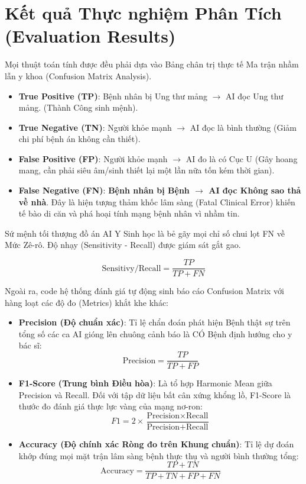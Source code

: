 \documentclass[conference,a4paper]{IEEEtran}
\begin{document}
\section{Kết quả Thực nghiệm Phân Tích (Evaluation Results)}
Mọi thuật toán tính được đều phải dựa vào Bảng chân trị thực tế Ma trận nhầm lẫn y khoa (Confusion Matrix Analysis).
\begin{itemize}
\item \textbf{True Positive (TP)}: Bệnh nhân bị Ung thư mảng $\rightarrow$ AI đọc Ung thư mảng. (Thành Công sinh mệnh).
\item \textbf{True Negative (TN)}: Người khỏe mạnh $\rightarrow$ AI đọc là bình thường (Giảm chi phí bệnh án không cần thiết).
\item \textbf{False Positive (FP)}: Người khỏe mạnh $\rightarrow$ AI đo là có Cục U (Gây hoang mang, cần phải siêu âm/sinh thiết lại một lần nữa tốn kém thời gian).
\item \textbf{False Negative (FN)}: \textbf{Bệnh nhân bị Bệnh $\rightarrow$ AI đọc Không sao thả về nhà}. Đây là hiện tượng thảm khốc lâm sàng (Fatal Clinical Error) khiến tế bào di căn và phá hoại tính mạng bệnh nhân vì nhầm tin.
\end{itemize}

Sứ mệnh tối thượng đồ án AI Y Sinh học là bẻ gãy mọi chỉ số chui lọt FN về Mức Zê-rô.
Độ nhạy (Sensitivity - Recall) được giám sát gắt gao.

\begin{equation}
\text{Sensitivy/Recall} = \frac{TP}{TP + FN}
\end{equation}

Ngoài ra, code hệ thống đánh giá tự động sinh báo cáo Confusion Matrix với hàng loạt các độ đo (Metrics) khắt khe khác:
\begin{itemize}
\item \textbf{Precision (Độ chuẩn xác)}: Tỉ lệ chẩn đoán phát hiện Bệnh thật sự trên tổng số các ca AI gióng lên chuông cảnh báo là CÓ Bệnh định hướng cho y bác sĩ:
\begin{equation} \text{Precision} = \frac{TP}{TP + FP} \end{equation}
\item \textbf{F1-Score (Trung bình Điều hòa)}: Là tổ hợp Harmonic Mean giữa Precision và Recall. Đối với tập dữ liệu bất cân xứng khổng lồ, F1-Score là thước đo đánh giá thực lực vàng của mạng nơ-ron:
\begin{equation} F1 = 2 \times \frac{\text{Precision} \times \text{Recall}}{\text{Precision} + \text{Recall}} \end{equation}
\item \textbf{Accuracy (Độ chính xác Ròng đo trên Khung chuẩn)}: Tỉ lệ dự đoán khớp đúng mọi mặt trận lâm sàng bệnh thực thụ và người bình thường tổng:
\begin{equation} \text{Accuracy} = \frac{TP + TN}{TP + TN + FP + FN} \end{equation}
\end{itemize}
\end{document}
